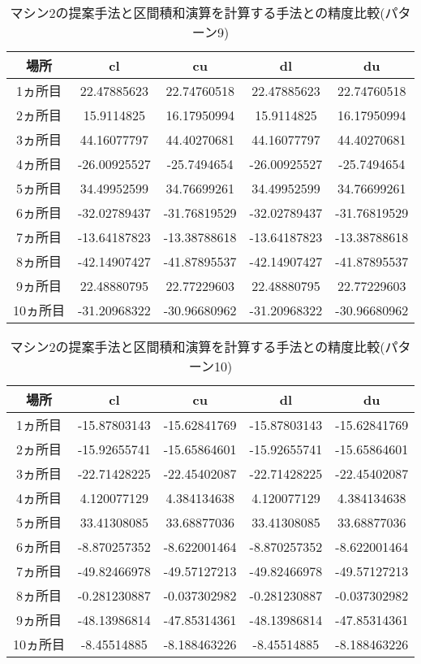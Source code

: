 \documentclass[11pt,a4paper]{jsreport}
\theoremstyle{definition}
\begin{document}
\begin{table}[H]
\centering
\begin{tabular}{|c|c|c|c|c|}
\hline
場所 & cl & cu & dl & du \\ \hline
1ヵ所目 & 22.47885623 & 22.74760518 & 22.47885623 & 22.74760518 \\ \hline
2ヵ所目 & 15.9114825 & 16.17950994 & 15.9114825 & 16.17950994 \\ \hline
3ヵ所目 & 44.16077797 & 44.40270681 & 44.16077797 & 44.40270681 \\ \hline
4ヵ所目 & -26.00925527 & -25.7494654 & -26.00925527 & -25.7494654 \\ \hline
5ヵ所目 & 34.49952599 & 34.76699261 & 34.49952599 & 34.76699261 \\ \hline
6ヵ所目 & -32.02789437 & -31.76819529 & -32.02789437 & -31.76819529 \\ \hline
7ヵ所目 & -13.64187823 & -13.38788618 & -13.64187823 & -13.38788618 \\ \hline
8ヵ所目 & -42.14907427 & -41.87895537 & -42.14907427 & -41.87895537 \\ \hline
9ヵ所目 & 22.48880795 & 22.77229603 & 22.48880795 & 22.77229603 \\ \hline
10ヵ所目 & -31.20968322 & -30.96680962 & -31.20968322 & -30.96680962 \\ \hline
\end{tabular}
\caption{マシン2の提案手法と区間積和演算を計算する手法との精度比較(パターン9)}
\end{table}

\begin{table}[H]
\centering
\begin{tabular}{|c|c|c|c|c|}
\hline
場所 & cl & cu & dl & du \\ \hline
1ヵ所目 & -15.87803143 & -15.62841769 & -15.87803143 & -15.62841769 \\ \hline
2ヵ所目 & -15.92655741 & -15.65864601 & -15.92655741 & -15.65864601 \\ \hline
3ヵ所目 & -22.71428225 & -22.45402087 & -22.71428225 & -22.45402087 \\ \hline
4ヵ所目 & 4.120077129 & 4.384134638 & 4.120077129 & 4.384134638 \\ \hline
5ヵ所目 & 33.41308085 & 33.68877036 & 33.41308085 & 33.68877036 \\ \hline
6ヵ所目 & -8.870257352 & -8.622001464 & -8.870257352 & -8.622001464 \\ \hline
7ヵ所目 & -49.82466978 & -49.57127213 & -49.82466978 & -49.57127213 \\ \hline
8ヵ所目 & -0.281230887 & -0.037302982 & -0.281230887 & -0.037302982 \\ \hline
9ヵ所目 & -48.13986814 & -47.85314361 & -48.13986814 & -47.85314361 \\ \hline
10ヵ所目 & -8.45514885 & -8.188463226 & -8.45514885 & -8.188463226 \\ \hline
\end{tabular}
\caption{マシン2の提案手法と区間積和演算を計算する手法との精度比較(パターン10)}
\end{table}
\end{document}
